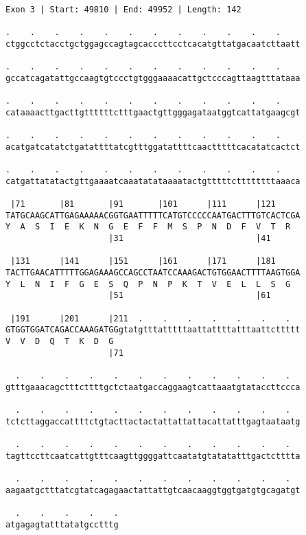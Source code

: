 \documentclass{article}
\begin{document}
\newpage
\begin{Verbatim}[fontfamily=courier]
Exon 3 | Start: 49810 | End: 49952 | Length: 142

.    .    .    .    .    .    .    .    .    .    .    .    
ctggcctctacctgctggagccagtagcacccttcctcacatgttatgacaatcttaatt

.    .    .    .    .    .    .    .    .    .    .    .    
gccatcagatattgccaagtgtccctgtgggaaaacattgctcccagttaagtttataaa

.    .    .    .    .    .    .    .    .    .    .    .    
cataaaacttgacttgttttttctttgaactgttgggagataatggtcattatgaagcgt

.    .    .    .    .    .    .    .    .    .    .    .    
acatgatcatatctgatattttatcgtttggatattttcaactttttcacatatcactct

.    .    .    .    .    .    .    .    .    .    .    .    
catgattatatactgttgaaaatcaaatatataaaatactgtttttcttttttttaaaca

 |71       |81       |91       |101      |111      |121     
TATGCAAGCATTGAGAAAAACGGTGAATTTTTCATGTCCCCCAATGACTTTGTCACTCGA
Y  A  S  I  E  K  N  G  E  F  F  M  S  P  N  D  F  V  T  R  
                     |31                           |41      

 |131      |141      |151      |161      |171      |181     
TACTTGAACATTTTTGGAGAAAGCCAGCCTAATCCAAAGACTGTGGAACTTTTAAGTGGA
Y  L  N  I  F  G  E  S  Q  P  N  P  K  T  V  E  L  L  S  G  
                     |51                           |61      

 |191      |201      |211  .    .    .    .    .    .    .  
GTGGTGGATCAGACCAAAGATGGgtatgtttatttttaattattttatttaattcttttt
V  V  D  Q  T  K  D  G                                      
                     |71                                    

  .    .    .    .    .    .    .    .    .    .    .    .  
gtttgaaacagctttcttttgctctaatgaccaggaagtcattaaatgtataccttccca

  .    .    .    .    .    .    .    .    .    .    .    .  
tctcttaggaccattttctgtacttactactattattattacattatttgagtaataatg

  .    .    .    .    .    .    .    .    .    .    .    .  
tagttccttcaatcattgtttcaagttggggattcaatatgtatatatttgactctttta

  .    .    .    .    .    .    .    .    .    .    .    .  
aagaatgctttatcgtatcagagaactattattgtcaacaaggtggtgatgtgcagatgt

  .    .    .    .    .
atgagagtatttatatgcctttg
\end{Verbatim}
\end{document}
